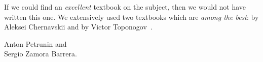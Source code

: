 If we could find an \emph{excellent} textbook on the subject, then we would not have written this one.
We extensively used two textbooks which are \emph{among the best}: by Aleksei Chernavskii \cite{chernavsky} and by Victor Toponogov~\cite{toponogov-book}.


\begin{flushright}
Anton Petrunin and\\
Sergio Zamora Barrera.
\end{flushright}



\newpage
\tableofcontents
